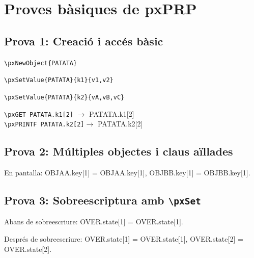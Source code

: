 \documentclass{article}
\begin{document}
\section*{Proves bàsiques de pxPRP}



\subsection*{Prova 1: Creació i accés bàsic}
\verb*|\pxNewObject{PATATA}|\\

\verb*|\pxSetValue{PATATA}{k1}{v1,v2}|\\

\verb*|\pxSetValue{PATATA}{k2}{vA,vB,vC}|\\

\verb*|\pxGET PATATA.k1[2]| $\to$ \pxGET PATATA.k1[2]\\

\verb*|\pxPRINTF PATATA.k2[2]|$\to$ \pxPRINTF PATATA.k2[2]

\bigskip

\subsection*{Prova 2: Múltiples objectes i claus aïllades}



En pantalla: OBJAA.key[1] = \pxGET OBJAA.key[1],\quad
OBJBB.key[1] = \pxGET OBJBB.key[1].

\bigskip

\subsection*{Prova 3: Sobreescriptura amb \texttt{\textbackslash pxSet}}


Abans de sobreescriure: OVER.state[1] = \pxGET OVER.state[1].


Després de sobreescriure: OVER.state[1] = \pxGET OVER.state[1],\quad
OVER.state[2] = \pxGET OVER.state[2].
\end{document}
